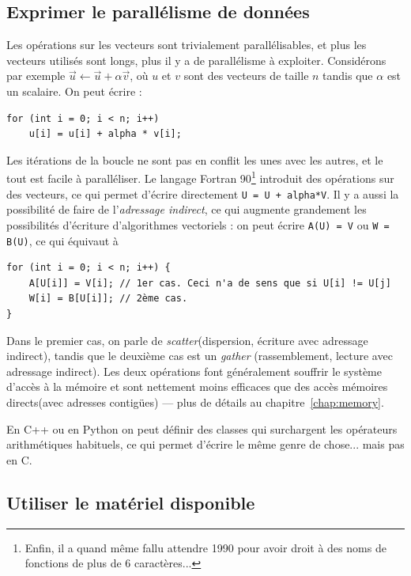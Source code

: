 \subsection{Exprimer le parallélisme de données}

Les opérations sur les vecteurs sont trivialement parallélisables, et plus les
vecteurs utilisés sont longs, plus il y a de parallélisme à
exploiter. Considérons par exemple $\vec u \gets \vec u + \alpha \vec v$, où $u$
et $v$ sont des vecteurs de taille $n$ tandis que $\alpha$ est un scalaire. On
peut écrire :
\begin{verbatim}
for (int i = 0; i < n; i++)
    u[i] = u[i] + alpha * v[i];
\end{verbatim}
Les itérations de la boucle ne sont pas en conflit les unes avec les autres, et
le tout est facile à paralléliser. Le langage \textsf{Fortran
  90}\footnote{Enfin, il a quand même fallu attendre 1990 pour avoir droit à des
  noms de fonctions de plus de 6 caractères...} introduit des opérations sur des
vecteurs, ce qui permet d'écrire directement \texttt{U = U + alpha*V}.
Il y a aussi la possibilité de faire de l'\emph{adressage indirect}, ce qui
augmente grandement les possibilités d'écriture d'algorithmes vectoriels : on
peut écrire \texttt{A(U) = V} ou \texttt{W = B(U)},
ce qui équivaut à
\begin{verbatim}
for (int i = 0; i < n; i++) {
    A[U[i]] = V[i]; // 1er cas. Ceci n'a de sens que si U[i] != U[j]
    W[i] = B[U[i]]; // 2ème cas.
}
\end{verbatim}

Dans le premier cas, on parle de \og \emph{scatter}\fg (dispersion, écriture
avec adressage indirect), tandis que le deuxième cas est un \og \emph{gather}\fg
(rassemblement, lecture avec adressage indirect). Les deux opérations font
généralement souffrir le système d'accès à la mémoire et sont nettement moins
efficaces que des accès mémoires \og directs\fg (avec adresses contigües) ---
plus de détails au chapitre~\ref{chap:memory}.

En \textsf{C++} ou en \textsf{Python} on peut définir des classes qui
surchargent les opérateurs arithmétiques habituels, ce qui permet d'écrire le
même genre de chose... mais pas en \textsf{C}.


\subsection{Utiliser le matériel disponible}

